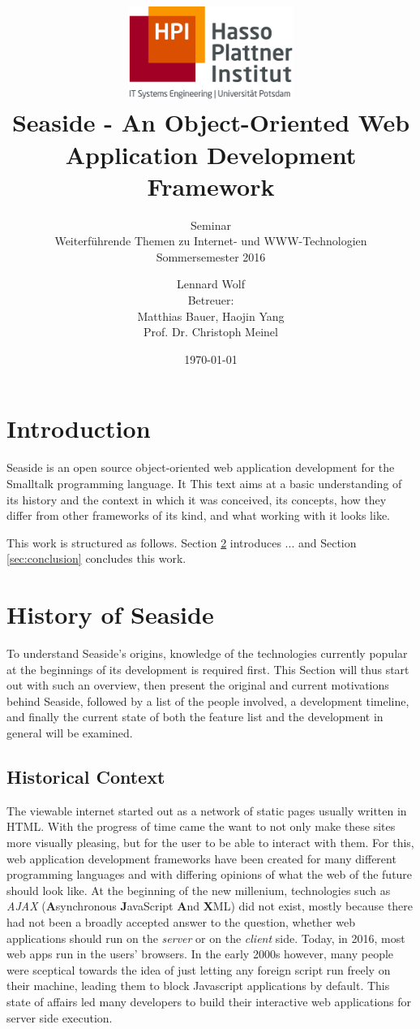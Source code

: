 \documentclass[a4paper,12pt,pagesize,headsepline,oribibl,titlepage]{scrartcl}
\title{
	\includegraphics*[width=0.4\textwidth]{hpi_logo.png}\\
	\vspace{24pt}
	 Seaside - An Object-Oriented Web Application Development Framework
}
\subtitle{
	Seminar\\
	Weiterführende Themen zu Internet- und WWW-Technologien\\
	Sommersemester 2016
}
\author{
	Lennard Wolf\\[12pt]
	Betreuer:\\
	Matthias Bauer, Haojin Yang\\
	Prof. Dr. Christoph Meinel
}
\date{\today}
\begin{document}
\maketitle
\tableofcontents
\newpage

\section{Introduction}
Seaside is an open source object-oriented web application development for the Smalltalk programming language. It  This text aims at a basic understanding of its history and the context in which it was conceived, its concepts, how they differ from other frameworks of its kind, and what working with it looks like. 

This work is structured as follows. Section \ref{sec:history} introduces 
... 
 and Section \ref{sec:conclusion} concludes this work.


\section{History of Seaside}
\label{sec:history}
To understand Seaside's origins, knowledge of the technologies currently popular at the beginnings of its development is required first. This Section will thus start out with such an overview, then present the original and current motivations behind Seaside, followed by a list of the people involved, a development timeline, and finally the current state of both the feature list and the development in general will be examined.

\subsection{Historical Context}
\label{sec:context} 

The viewable internet started out as a network of static pages usually written in HTML. With the progress of time came the want to not only make these sites more visually pleasing, but for the user to be able to interact with them. For this, web application development frameworks have been created for many different programming languages and with differing opinions of what the web of the future should look like. At the beginning of the new millenium, technologies such as \emph{AJAX} (\textbf{A}synchronous \textbf{J}avaScript \textbf{A}nd \textbf{X}ML) did not exist, mostly because there had not been a broadly accepted answer to the question, whether web applications should run on the \emph{server} or on the \emph{client} side. Today, in 2016, most web apps run in the users' browsers. In the early 2000s however, many people were sceptical towards the idea of just letting any foreign script run freely on their machine, leading them to block Javascript applications by default. This state of affairs led many developers to build their interactive web applications for server side execution. 
\end{document}
